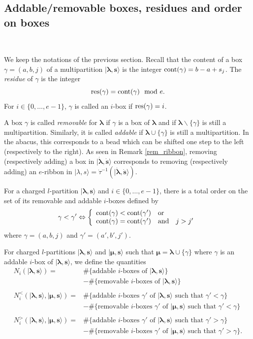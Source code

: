 \documentclass[twoside,12pt]{amsart}
\theoremstyle{plain}
\newcommand{\bs}{\mathbf{s}}
\newcommand{\la}{\lambda}
\newcommand{\ga}{\gamma}
\newcommand{\bla}{\boldsymbol{\la}}
\newcommand{\bmu}{\boldsymbol{\mu}}
\newcommand{\dtau}{\dot{\tau}}
\newcommand{\dbs}{\dot{\bs}}
\newcommand{\dbla}{\dot{\bla}}
\newcommand{\eq}{\Leftrightarrow}
\newcommand{\mand}{\quad\text{and}\quad}
\newcommand{\res}{\text{\rm res}}
\newcommand{\cont}{\text{\rm cont}}
\theoremstyle{remark}
\begin{document}
\subsection{Addable/removable boxes, residues and order on boxes}\label{add_rem_boxes} \

We keep the notations of the previous section.
Recall that the content of a box $\ga=(a,b,j)$ of a multipartition $|\bla,\bs\rangle$
is the integer $\cont(\ga) = b-a+s_j$.
The \textit{residue} of $\ga$ is the integer $$\res(\ga) = \cont(\ga) \mod e.$$
For $i\in\{0,\dots,e-1\}$, $\ga$ is called an $i$-box if $\res(\ga)=i$.

A box $\ga$ is called \textit{removable} for $\bla$ if
$\ga$ is a box of $\bla$ and if $\bla \backslash \{\ga\}
$ is still a multipartition.
Similarly, it is called \textit{addable} if $\bla \cup \{\ga\}$ is still a multipartition.
In the abacus, this corresponds to a bead which can be shifted one step to the left (respectively to the right).
As seen in Remark \ref{rem_ribbon},
removing (respectively adding) a box in $|\dbla,\dbs\rangle$ 
corresponds to removing (respectively adding) an $e$-ribbon in $|\la,s\rangle=\dtau^{-1}(|\dbla,\dbs\rangle)$.

For a charged $l$-partition $|\bla,\bs\rangle$ and $i\in\{0,\dots,e-1\}$, 
there is a total order on the set of its removable and addable $i$-boxes defined by
\begin{equation}
\ga < \ga' \eq \left\{
\begin{array}{l}
\cont(\ga) < \cont(\ga') \text{\quad or} \\
\cont(\ga) = \cont(\ga')\mand j>j'
\end{array}
\right.
\end{equation}
where $\ga=(a,b,j)$ and $\ga'=(a',b',j')$.


For charged $l$-partitions $|\bla,\bs\rangle$
and $|\bmu,\bs\rangle$ such that $\bmu = \bla\cup\{\ga\}$
where $\ga$ is an addable $i$-box of $|\bla,\bs\rangle$, 
we define the quantities
\begin{equation}
\begin{array}{rl}
N_i(|\bla,\bs\rangle) = & \# \{ \text{addable $i$-boxes of $|\bla,\bs\rangle$} \} \\
& - \# \{ \text{removable $i$-boxes of $|\bla,\bs\rangle$} \}\\
\\
N_i^<(|\bla,\bs\rangle,|\bmu,\bs\rangle) = & \# \{ \text{addable $i$-boxes $\ga'$ of $|\bla,\bs\rangle$ such that $\ga'<\ga$} \} \\
& - \# \{ \text{removable $i$-boxes $\ga'$ of $|\bmu,\bs\rangle$ such that $\ga'<\ga$} \}\\
\\
N_i^>(|\bla,\bs\rangle,|\bmu,\bs\rangle) = & \# \{ \text{addable $i$-boxes $\ga'$ of $|\bla,\bs\rangle$ such that $\ga'>\ga$} \} \\
& - \# \{ \text{removable $i$-boxes $\ga'$ of $|\bmu,\bs\rangle$ such that $\ga'>\ga$} \}.\\
\end{array}
\end{equation}
\end{document}

